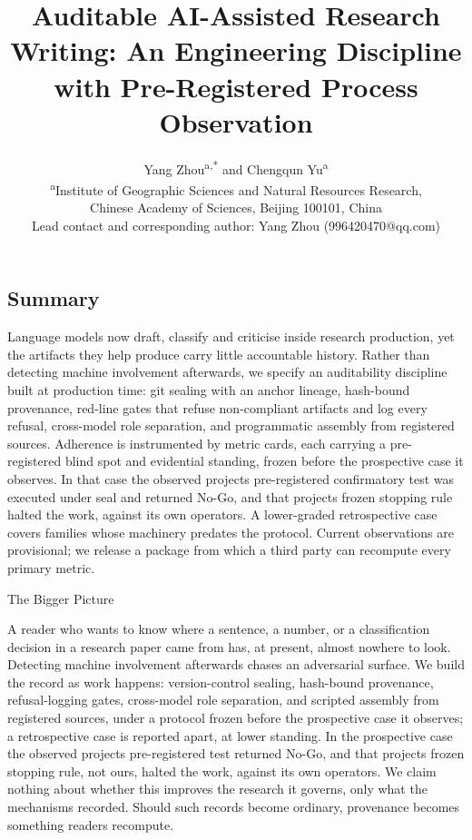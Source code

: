 \documentclass[
  english,
]{article}
\title{Auditable AI-Assisted Research Writing: An Engineering Discipline with Pre-Registered Process Observation}
\author{Yang Zhou\textsuperscript{a,*} and Chengqun Yu\textsuperscript{a}\\[4pt]
{\normalsize \textsuperscript{a}Institute of Geographic Sciences and Natural Resources Research,}\\
{\normalsize Chinese Academy of Sciences, Beijing 100101, China}\\[2pt]
{\normalsize *Lead contact and corresponding author: Yang Zhou (996420470@qq.com)}}
\date{}
\begin{document}
\hypersetup{pageanchor=false}
\maketitle

\subsection{Summary}\label{summary}

Language models now draft, classify and criticise inside research production, yet the artifacts they help produce carry little accountable history. Rather than detecting machine involvement afterwards, we specify an auditability discipline built at production time: git sealing with an anchor lineage, hash-bound provenance, red-line gates that refuse non-compliant artifacts and log every refusal, cross-model role separation, and programmatic assembly from registered sources. Adherence is instrumented by metric cards, each carrying a pre-registered blind spot and evidential standing, frozen before the prospective case it observes. In that case the observed project\textquotesingle s pre-registered confirmatory test was executed under seal and returned No-Go, and that project\textquotesingle s frozen stopping rule halted the work, against its own operators. A lower-graded retrospective case covers families whose machinery predates the protocol. Current observations are provisional; we release a package from which a third party can recompute every primary metric.

The Bigger Picture

A reader who wants to know where a sentence, a number, or a classification decision in a research paper came from has, at present, almost nowhere to look. Detecting machine involvement afterwards chases an adversarial surface. We build the record as work happens: version-control sealing, hash-bound provenance, refusal-logging gates, cross-model role separation, and scripted assembly from registered sources, under a protocol frozen before the prospective case it observes; a retrospective case is reported apart, at lower standing. In the prospective case the observed project\textquotesingle s pre-registered test returned No-Go, and that project\textquotesingle s frozen stopping rule, not ours, halted the work, against its own operators. We claim nothing about whether this improves the research it governs, only what the mechanisms recorded. Should such records become ordinary, provenance becomes something readers recompute.
\end{document}
